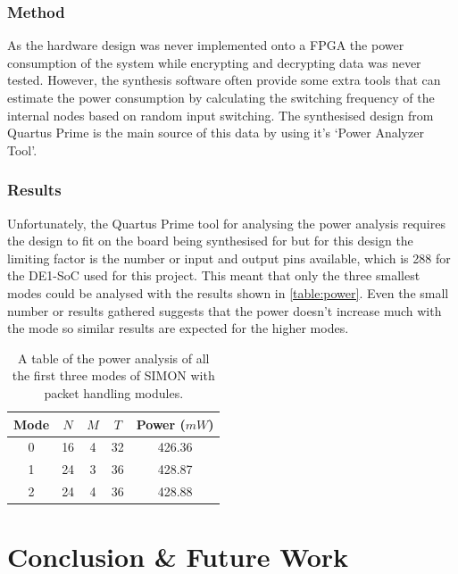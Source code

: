 \documentclass[12pt,twoside,a4paper]{report}
\begin{document}
	\subsection{Method}
	
	As the hardware design was never implemented onto a FPGA the power consumption of the system while encrypting and decrypting data was never tested. However, the synthesis software often provide some extra tools that can estimate the power consumption by calculating the switching frequency of the internal nodes based on random input switching. The synthesised design from Quartus Prime is the main source of this data by using it's `Power Analyzer Tool'. 
	
	\subsection{Results}
	
	Unfortunately, the Quartus Prime tool for analysing the power analysis requires the design to fit on the board being synthesised for but for this design the limiting factor is the number or input and output pins available, which is 288 for the DE1-SoC used for this project. This meant that only the three smallest modes could be analysed with the results shown in \autoref{table:power}. Even the small number or results gathered suggests that the power doesn't increase much with the mode so similar results are expected for the higher modes.
	
	\begin{table}[H]
	\centering
	\begin{tabular}{||c|c|c|c|c||}
		\hline \hline
		Mode & $N$ & $M$ & $T$ & Power ($mW$)\\
		\hline \hline
		0 & 16 & 4 & 32 & 426.36 \\
		\hline
		1 & 24 & 3 & 36 & 428.87 \\
		2 & 24 & 4 & 36 & 428.88  \\
		\hline \hline
	\end{tabular}
	\caption{A table of the power analysis of all the first three modes of SIMON with packet handling modules.}
	\label{table:power}
	\end{table}

	\chapter{Conclusion \& Future Work}
	\label{chapter:CONC}
	
\end{document}
